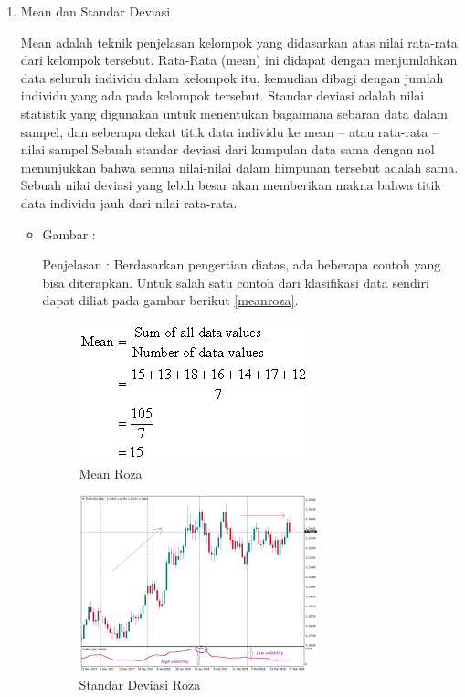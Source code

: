 \begin{enumerate}
\item Mean dan Standar Deviasi
\par Mean adalah teknik penjelasan kelompok yang didasarkan atas nilai rata-rata dari kelompok tersebut. Rata-Rata (mean) ini didapat dengan menjumlahkan data seluruh individu dalam kelompok itu, kemudian dibagi dengan jumlah individu yang ada pada kelompok tersebut. Standar deviasi adalah nilai statistik yang digunakan untuk menentukan bagaimana sebaran data dalam sampel, dan seberapa dekat titik data individu ke mean – atau rata-rata – nilai sampel.Sebuah standar deviasi dari kumpulan data sama dengan nol menunjukkan bahwa semua nilai-nilai dalam himpunan tersebut adalah sama. Sebuah nilai deviasi yang lebih besar akan memberikan makna bahwa titik data individu jauh dari nilai rata-rata.
\par
\begin{itemize}
\item Gambar :
\par Penjelasan : Berdasarkan pengertian diatas, ada beberapa contoh yang bisa diterapkan. Untuk salah satu contoh dari klasifikasi data sendiri dapat diliat pada gambar berikut \ref{meanroza}.
\begin{figure}[!hbtp]
\centering
\includegraphics[scale=0.2]{figures/meanroza.png}
\caption{Mean Roza}
\label{text-fadila}
\end{figure}
\begin{figure}[!hbtp]
\centering
\includegraphics[scale=0.2]{figures/standarroza.png}
\caption{Standar Deviasi Roza}
\label{text-fadila}
\end{figure}
\par
\end{itemize}


\end{enumerate}
